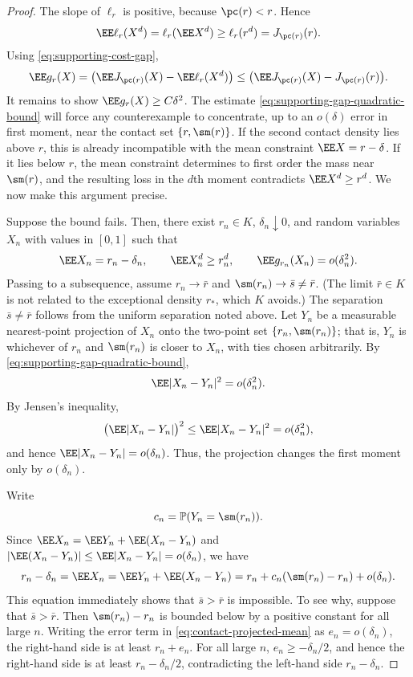 \begin{proof}
The slope of $\ell_r$ is positive, because $\pc(r)<r$.  Hence
\[
  \EE\ell_r(X^d)
  =   \ell_r(\EE X^d)
  \ge \ell_r(r^d)
  =   J_{\pc(r)}(r).
\]
Using \eqref{eq:supporting-cost-gap},
\[
  \EE g_r(X)
  =   \bigl(\EE J_{\pc(r)}(X)-\EE \ell_r(X^d)\bigr)
  \le \bigl(\EE J_{\pc(r)}(X)-J_{\pc(r)}(r)\bigr).
\]
It remains to show $\EE g_r(X)\ge C\delta^2$.  The estimate
\eqref{eq:supporting-gap-quadratic-bound} will force any counterexample to concentrate, up to
an $o(\delta)$ error in first moment, near the contact set $\{r,\sm(r)\}$.
If the second contact density lies above $r$, this is already incompatible
with the mean constraint $\EE X=r-\delta$.  If it lies below $r$, the mean
constraint determines to first order the mass near $\sm(r)$, and the resulting
loss in the $d$th moment contradicts $\EE X^d\ge r^d$.  We now make this
argument precise.

Suppose the bound fails.  Then, there exist $r_n\in K$, $\delta_n\downarrow0$,
and random variables $X_n$ with values in $[0,1]$ such that
\[
  \EE X_n=r_n-\delta_n,
  \qquad
  \EE X_n^d\ge r_n^d,
  \qquad
  \EE g_{r_n}(X_n)=o(\delta_n^2).
\]
Passing to a subsequence, assume $r_n\to\bar r$ and
$\sm(r_n)\to\bar s\ne\bar r$.  (The limit $\bar r\in K$ is not related to
the exceptional density $r_*$, which $K$ avoids.)  The separation
$\bar s\ne\bar r$ follows from the uniform separation noted above.  Let $Y_n$ be a measurable nearest-point
projection of $X_n$ onto the two-point set $\{r_n,\sm(r_n)\}$; that is, $Y_n$
is whichever of $r_n$ and $\sm(r_n)$ is closer to $X_n$, with ties chosen
arbitrarily.  By
\eqref{eq:supporting-gap-quadratic-bound},
\[
  \EE |X_n-Y_n|^2=o(\delta_n^2).
\]
By Jensen's inequality,
\[
  \bigl(\EE|X_n-Y_n|\bigr)^2
  \le \EE|X_n-Y_n|^2
  =o(\delta_n^2),
\]
and hence $\EE|X_n-Y_n|=o(\delta_n)$.
Thus, the projection changes the first moment only by $o(\delta_n)$.

Write
\[
  c_n=\mathbb P(Y_n=\sm(r_n)).
\]
Since $\EE X_n = \EE Y_n + \EE(X_n-Y_n)$ and
$|\EE(X_n-Y_n)| \le \EE|X_n-Y_n|=o(\delta_n)$, we have
\begin{equation}\label{eq:contact-projected-mean}
  r_n-\delta_n
  = \EE X_n
  = \EE Y_n+\EE(X_n-Y_n)
  =r_n+c_n(\sm(r_n)-r_n)+o(\delta_n).
\end{equation}
This equation immediately shows that $\bar s>\bar r$ is impossible.  To see
why, suppose that $\bar s>\bar r$.  Then $\sm(r_n)-r_n$ is bounded below by a
positive constant for all
large $n$.  Writing the error term in
\eqref{eq:contact-projected-mean} as $e_n=o(\delta_n)$, the right-hand side is at
least $r_n+e_n$.  For all large $n$, $e_n\ge -\delta_n/2$, and hence the
right-hand side is at least $r_n-\delta_n/2$, contradicting the left-hand side
$r_n-\delta_n$.


\end{proof}
